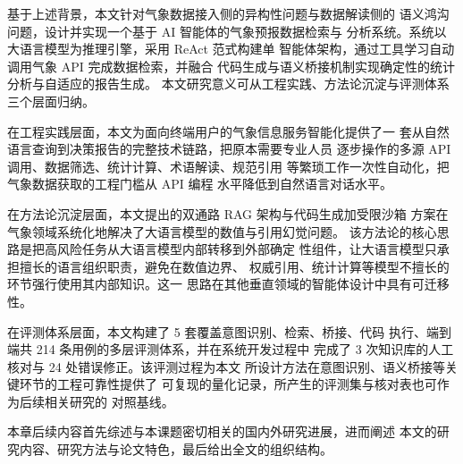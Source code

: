 基于上述背景，本文针对气象数据接入侧的异构性问题与数据解读侧的
语义鸿沟问题，设计并实现一个基于 AI 智能体的气象预报数据检索与
分析系统。系统以大语言模型为推理引擎，采用 ReAct 范式构建单
智能体架构，通过工具学习自动调用气象 API 完成数据检索，并融合
代码生成与语义桥接机制实现确定性的统计分析与自适应的报告生成。
本文研究意义可从工程实践、方法论沉淀与评测体系三个层面归纳。

在工程实践层面，本文为面向终端用户的气象信息服务智能化提供了一
套从自然语言查询到决策报告的完整技术链路，把原本需要专业人员
逐步操作的多源 API 调用、数据筛选、统计计算、术语解读、规范引用
等繁琐工作一次性自动化，把气象数据获取的工程门槛从 API 编程
水平降低到自然语言对话水平。

在方法论沉淀层面，本文提出的双通路 RAG 架构与代码生成加受限沙箱
方案在气象领域系统化地解决了大语言模型的数值与引用幻觉问题。
该方法论的核心思路是把高风险任务从大语言模型内部转移到外部确定
性组件，让大语言模型只承担擅长的语言组织职责，避免在数值边界、
权威引用、统计计算等模型不擅长的环节强行使用其内部知识。这一
思路在其他垂直领域的智能体设计中具有可迁移性。

在评测体系层面，本文构建了 5 套覆盖意图识别、检索、桥接、代码
执行、端到端共 214 条用例的多层评测体系，并在系统开发过程中
完成了 3 次知识库的人工核对与 24 处错误修正。该评测过程为本文
所设计方法在意图识别、语义桥接等关键环节的工程可靠性提供了
可复现的量化记录，所产生的评测集与核对表也可作为后续相关研究的
对照基线。

本章后续内容首先综述与本课题密切相关的国内外研究进展，进而阐述
本文的研究内容、研究方法与论文特色，最后给出全文的组织结构。

